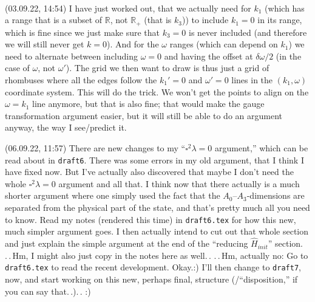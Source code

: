 \documentclass{report}
\begin{document}


\ 

(03.09.22, 14:54) I have just worked out, that we actually need for $k_1$ (which has a range that is a subset of $\mathbb{R}$, not $\mathbb{R}_+$ (that is $k_3$)) to include $k_1 = 0$ in its range, which is fine since we just make sure that $k_3 = 0$ is never included (and therefore we will still never get $k=0$). And for the $\omega$ ranges (which can depend on $k_1$) we need to alternate between including $\omega = 0$ and having the offset at $\delta \omega / 2$ (in the case of $\omega$, not $\omega'$). The grid we then want to draw is thus just a grid of rhombuses where all the edges follow the $k_1'=0$ and $\omega'=0$ lines in the $(k_1, \omega)$ coordinate system. This will do the trick. We won't get the points to align on the $\omega = k_1$ line anymore, but that is also fine; that would make the gauge transformation argument easier, but it will still be able to do an argument anyway, the way I see/predict it. 


(06.09.22, 11:57) There are new changes to my ``$\square^2\lambda = 0$ argument,'' which can be read about in \texttt{draft6}. There was some errors in my old argument, that I think I have fixed now. But I've actually also discovered that maybe I don't need the whole $\square^2\lambda = 0$ argument and all that. I think now that there actually is a much shorter argument where one simply used the fact that the $A_0$--$A_3$-dimensions are separated from the physical part of the state, and that's pretty much all you need to know. Read my notes (rendered this time) in \texttt{draft6.tex} for how this new, much simpler argument goes. I then actually intend to cut out that whole section and just explain the simple argument at the end of the ``reducing $\hat H_{init}$'' section. .\,.\,Hm, I might also just copy in the notes here as well.\,. .\,.\,Hm, actually no: Go to \texttt{draft6.tex} to read the recent development. Okay.:) I'll then change to \texttt{draft7}, now, and start working on this new, perhaps final, structure (/``disposition,'' if you can say that.\,.).\,. :) %
\end{document}
